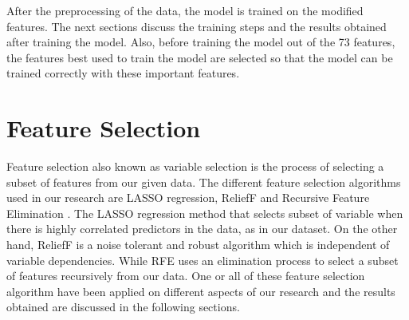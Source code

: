 After the preprocessing of the data, the model is trained on the modified features. The next sections discuss the training steps and the results obtained after training the model. Also, before training the model out of the 73 features, the features best used to train the model are selected so that the model can be trained correctly with these important features.

\section{Feature Selection}
Feature selection also known as variable selection is the process of selecting a subset of features from our given data. The different feature selection algorithms used in our research are LASSO regression, ReliefF and Recursive Feature Elimination
. The LASSO regression method that selects subset of variable when there is highly correlated predictors in the data, as in our dataset.  On the other hand, ReliefF is a noise tolerant and robust algorithm which is independent of variable dependencies. While RFE uses an elimination process to select a subset of features recursively from our data. One or all of these feature selection algorithm have been applied on different aspects of our research and the results obtained are discussed in the following sections.

